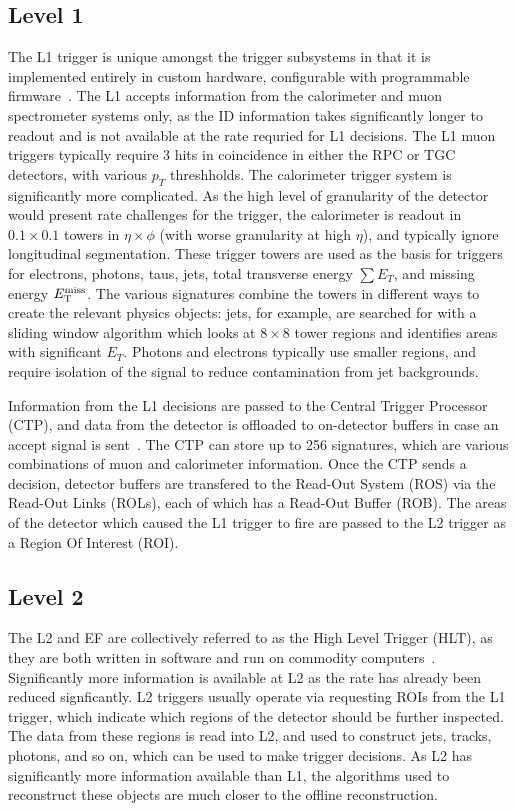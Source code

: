\subsection{Level 1}

The L1 trigger is unique amongst the trigger subsystems in that it is implemented entirely in custom hardware, configurable with programmable firmware~\cite{ATLASPaper,Trigger2010}. The L1 accepts information from the calorimeter and muon spectrometer systems only, as the ID information takes significantly longer to readout and is not available at the rate requried for L1 decisions.  The L1 muon triggers typically require 3 hits in coincidence in either the RPC or TGC detectors, with various $p_T$ threshholds. The calorimeter trigger system is significantly more complicated. As the high level of granularity of the detector would present rate challenges for the trigger, the calorimeter is readout in $0.1\times0.1$ towers in $\eta \times \phi$ (with worse granularity at high $\eta$), and typically ignore longitudinal segmentation. These trigger towers are used as the basis for triggers for electrons, photons, taus, jets, total transverse energy $\sum E_T$, and missing energy $E_{\mathrm{T}}^{\text{miss}}$. The various signatures combine the towers in different ways to create the relevant physics objects: jets, for example, are searched for with a sliding window algorithm which looks at $8\times 8$ tower regions and identifies areas with significant $E_T$. Photons and electrons typically use smaller regions, and require isolation of the signal to reduce contamination from jet backgrounds.

Information from the L1 decisions are passed to the Central Trigger Processor (CTP), and data from the detector is offloaded to on-detector buffers in case an accept signal is sent~\cite{ATLASPaper}. The CTP can store up to 256 signatures, which are various combinations of muon and calorimeter information. Once the CTP sends a decision, detector buffers are transfered to the Read-Out System (ROS) via the Read-Out Links (ROLs), each of which has a Read-Out Buffer (ROB). The areas of the detector which caused the L1 trigger to fire are passed to the L2 trigger as a Region Of Interest (ROI).

\subsection{Level 2}

The L2 and EF are collectively referred to as the High Level Trigger (HLT), as they are both written in software and run on commodity computers~\cite{ATLASPaper}. Significantly more information is available at L2 as the rate has already been reduced signficantly. L2 triggers usually operate via requesting ROIs from the L1 trigger, which indicate which regions of the detector should be further inspected. The data from these regions is read into L2, and used to construct jets, tracks, photons, and so on, which can be used to make trigger decisions. As L2 has significantly more information available than L1, the algorithms used to reconstruct these objects are much closer to the offline reconstruction.

